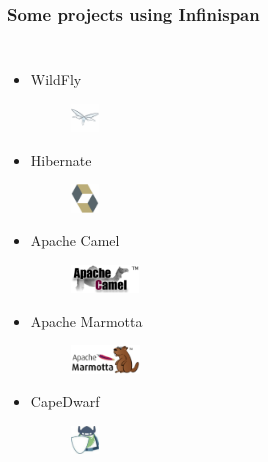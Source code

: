 \documentclass[10pt,utf8]{beamer}
\begin{document}
\begin{frame}
	\frametitle{Some projects using Infinispan}
	\begin{columns}
		\begin{itemize}
			\item WildFly
				\hspace{10cm}
				\begin{figure}
					\vspace{-1cm}
					\includegraphics[height=0.75cm]{./img/wildfly.eps}
				\end{figure}
			\item Hibernate
				\hspace{10cm}
				\begin{figure}
					\vspace{-1cm}
					\includegraphics[height=0.75cm]{./img/hibernate.eps}
				\end{figure}
			\item Apache Camel
				\hspace{10cm}
				\begin{figure}
					\vspace{-1cm}
					\includegraphics[height=0.75cm]{./img/apache-camel.eps}
				\end{figure}
			\item Apache Marmotta
				\hspace{10cm}
				\begin{figure}
					\vspace{-1cm}
					\includegraphics[height=0.75cm]{./img/marmotta.eps}
				\end{figure}
			\item CapeDwarf
				\hspace{10cm}
				\begin{figure}
					\vspace{-1cm}
					\includegraphics[height=0.75cm]{./img/capedwarf.eps}

\end{figure}
\end{itemize}
\end{columns}
\end{frame}
\end{document}

